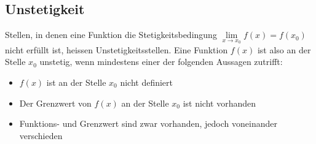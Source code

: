 \subsection{Unstetigkeit}
Stellen, in denen eine Funktion die Stetigkeitsbedingung \(\lim\limits_{x \rightarrow x_0}{f(x)} = f(x_0)\) nicht erfüllt ist, heissen Unstetigkeitsstellen.
\newline Eine Funktion \(f(x)\) ist also an der Stelle \(x_0\) unstetig, wenn mindestens einer der folgenden Aussagen zutrifft:
\begin{itemize}
	\item \(f(x)\) ist an der Stelle \(x_0\) nicht definiert
	\item Der Grenzwert von \(f(x)\) an der Stelle \(x_0\) ist nicht vorhanden
	\item Funktions- und Grenzwert sind zwar vorhanden, jedoch voneinander verschieden
\end{itemize}
